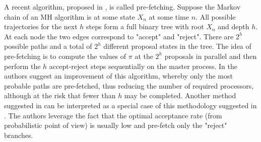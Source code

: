 \documentclass[11pt]{article}       %
\begin{document}
A recent algorithm, proposed in \cite{brockwell2006parallel}, is called 
pre-fetching.  Suppose the Markov chain of an MH algorithm is at some state
$X_n$ at some time $n$.  All possible trajectories for the next $h$ steps 
form a full binary tree with root $X_n$ and depth $h$.  At each node 
the two edges correspond to "accept" and "reject".  
There are $2^h$ possible paths and a total of $2^h$ different 
proposal states in the tree.  The idea of pre-fetching is to compute the values of $\pi$
at the $2^h$ proposals in parallel and then perform the $h$ accept-reject 
steps sequentially on the master process.  In \cite{strid2010efficient} 
the authors suggest an improvement of this algorithm, whereby only the most probable 
paths are pre-fetched, thus reducing the number of required processors, although at
the risk that fewer than $h$ may be completed.  Another method suggested in 
\cite{byrd2008reducing} can be interpreted as a special case of this methodology 
suggested in \cite{strid2010efficient}.  The authors leverage the fact that the optimal 
acceptance rate (from probabilistic point of view) is usually low and pre-fetch 
only the "reject" branches.






\end{document}
